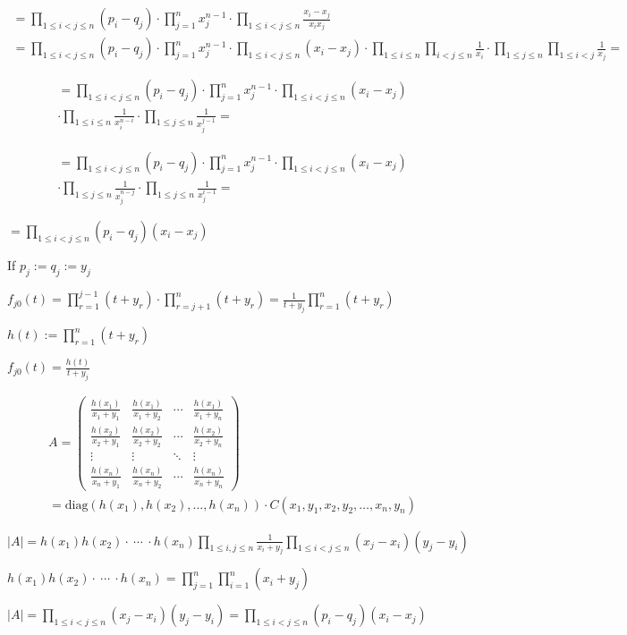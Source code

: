 \documentclass{article}
\begin{document}
\begin{multline*}
= \prod_{1 \leq i < j \leq n} (p_{i} - q_{j}) \cdot \prod_{j=1}^{n} x_{j}^{n-1} \cdot \prod_{1 \leq i < j \leq n} \frac{x_{i}-x_{j}}{x_{i}x_{j}} \\
= \prod_{1 \leq i < j \leq n} (p_{i} - q_{j}) \cdot \prod_{j=1}^{n} x_{j}^{n-1} \cdot \prod_{1 \leq i < j \leq n} (x_{i}-x_{j}) \cdot \prod_{1\leq i \leq n}\prod_{i < j \leq n} \frac{1}{x_{i}} \cdot \prod_{1\leq j \leq n}\prod_{1 \leq i < j} \frac{1}{x_{j}} =
\end{multline*}

\begin{multline*}
= \prod_{1 \leq i < j \leq n} (p_{i} - q_{j}) \cdot \prod_{j=1}^{n} x_{j}^{n-1} \cdot \prod_{1 \leq i < j \leq n} (x_{i}-x_{j}) \\
\cdot \prod_{1\leq i \leq n}\frac{1}{x_{i}^{n-i}} \cdot \prod_{1\leq j \leq n}\frac{1}{x_{j}^{j-1}} =
\end{multline*}

\begin{multline*}
= \prod_{1 \leq i < j \leq n} (p_{i} - q_{j}) \cdot \prod_{j=1}^{n} x_{j}^{n-1} \cdot \prod_{1 \leq i < j \leq n} (x_{i}-x_{j}) \\
\cdot \prod_{1\leq j \leq n}\frac{1}{x_{j}^{n-j}} \cdot \prod_{1\leq j \leq n}\frac{1}{x_{j}^{i-1}} =
\end{multline*}

\( = \prod_{1 \leq i < j \leq n} (p_{i} - q_{j})(x_{i}-x_{j}) \)

If \( p_{j} := q_{j} := y_{j} \)

\( f_{j0}(t) = \prod_{r=1}^{j-1}(t+y_{r}) \cdot \prod_{r=j+1}^{n}(t+y_{r}) = \frac{1}{t+y_{j}} \prod_{r=1}^{n}(t+y_{r}) \)

\( h(t) := \prod_{r=1}^{n}(t+y_{r}) \)

\( f_{j0}(t) = \frac{h(t)}{t+y_{j}} \)

\begin{multline*}
A = \left(\begin{matrix}\frac{h(x_{1})}{x_{1}+y_{1}} & \frac{h(x_{1})}{x_{1}+y_{2}} & \cdots & \frac{h(x_{1})}{x_{1}+y_{n}} \\ \frac{h(x_{2})}{x_{2}+y_{1}} & \frac{h(x_{2})}{x_{2}+y_{2}} & \cdots & \frac{h(x_{2})}{x_{2}+y_{n}} \\ \vdots & \vdots & \ddots & \vdots \\ \frac{h(x_{n})}{x_{n}+y_{1}} & \frac{h(x_{n})}{x_{n}+y_{2}} & \cdots & \frac{h(x_{n})}{x_{n}+y_{n}} \end{matrix}\right) \\
= \mathrm{diag}(h(x_{1}),h(x_{2}),\ldots,h(x_{n})) \cdot C(x_{1},y_{1},x_{2},y_{2},\ldots,x_{n}, y_{n})
\end{multline*}

\( |A| = h(x_{1})h(x_{2}) \cdot\ \cdots\ \cdot h(x_{n}) \prod_{1 \leq i,j \leq n}\frac{1}{x_{i}+y_{j}} \prod_{1 \leq i < j \leq n} (x_{j}-x_{i})(y_{j}-y_{i}) \)

\( h(x_{1})h(x_{2}) \cdot\ \cdots\ \cdot h(x_{n}) = \prod_{j=1}^{n}\prod_{i=1}^{n}(x_{i} + y_{j}) \)

\( |A| = \prod_{1 \leq i < j \leq n} (x_{j}-x_{i})(y_{j}-y_{i}) = \prod_{1 \leq i < j \leq n} (p_{i}-q_{j})(x_{i}-x_{j}) \)
\end{document}
